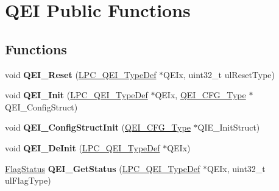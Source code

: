 \hypertarget{group___q_e_i___public___functions}{\section{\-Q\-E\-I \-Public \-Functions}
\label{group___q_e_i___public___functions}
}
\subsection*{\-Functions}
\begin{DoxyCompactItemize}
\item 
\hypertarget{group___q_e_i___public___functions_ga391328bc2265d37826cfdc74b3b3e8cc}{void {\bfseries \-Q\-E\-I\-\_\-\-Reset} (\hyperlink{struct_l_p_c___q_e_i___type_def}{\-L\-P\-C\-\_\-\-Q\-E\-I\-\_\-\-Type\-Def} $\ast$\-Q\-E\-Ix, uint32\-\_\-t ul\-Reset\-Type)}\label{group___q_e_i___public___functions_ga391328bc2265d37826cfdc74b3b3e8cc}

\item 
\hypertarget{group___q_e_i___public___functions_ga0cd290eb7df6690b43481398de590626}{void {\bfseries \-Q\-E\-I\-\_\-\-Init} (\hyperlink{struct_l_p_c___q_e_i___type_def}{\-L\-P\-C\-\_\-\-Q\-E\-I\-\_\-\-Type\-Def} $\ast$\-Q\-E\-Ix, \hyperlink{struct_q_e_i___c_f_g___type}{\-Q\-E\-I\-\_\-\-C\-F\-G\-\_\-\-Type} $\ast$\-Q\-E\-I\-\_\-\-Config\-Struct)}\label{group___q_e_i___public___functions_ga0cd290eb7df6690b43481398de590626}

\item 
\hypertarget{group___q_e_i___public___functions_ga6fd76f7a038b76fd5721012bf93a1aa0}{void {\bfseries \-Q\-E\-I\-\_\-\-Config\-Struct\-Init} (\hyperlink{struct_q_e_i___c_f_g___type}{\-Q\-E\-I\-\_\-\-C\-F\-G\-\_\-\-Type} $\ast$\-Q\-I\-E\-\_\-\-Init\-Struct)}\label{group___q_e_i___public___functions_ga6fd76f7a038b76fd5721012bf93a1aa0}

\item 
\hypertarget{group___q_e_i___public___functions_ga03796301ae42275411680e918a890edc}{void {\bfseries \-Q\-E\-I\-\_\-\-De\-Init} (\hyperlink{struct_l_p_c___q_e_i___type_def}{\-L\-P\-C\-\_\-\-Q\-E\-I\-\_\-\-Type\-Def} $\ast$\-Q\-E\-Ix)}\label{group___q_e_i___public___functions_ga03796301ae42275411680e918a890edc}

\item 
\hypertarget{group___q_e_i___public___functions_ga6eff2d73b957fce0d34205602369601d}{\hyperlink{group___l_p_c___types___public___types_ga89136caac2e14c55151f527ac02daaff}{\-Flag\-Status} {\bfseries \-Q\-E\-I\-\_\-\-Get\-Status} (\hyperlink{struct_l_p_c___q_e_i___type_def}{\-L\-P\-C\-\_\-\-Q\-E\-I\-\_\-\-Type\-Def} $\ast$\-Q\-E\-Ix, uint32\-\_\-t ul\-Flag\-Type)}\label{group___q_e_i___public___functions_ga6eff2d73b957fce0d34205602369601d}


\end{DoxyCompactItemize}
